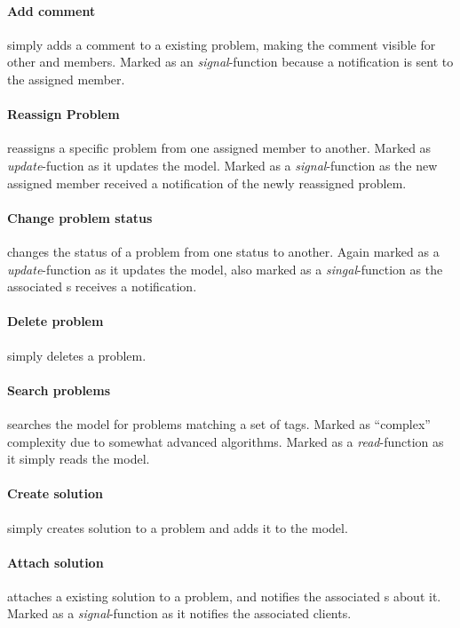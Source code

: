 \paragraph{Add comment} simply adds a comment to a existing problem, making the comment visible for other \client{} and \astaff[] members. Marked as an \textit{signal}-function because a notification is sent to the assigned \astaff[] member.  

\paragraph{Reassign Problem} reassigns a specific problem from one assigned \astaff[] member to another. Marked as \textit{update}-fuction as it updates the model. Marked as a \textit{signal}-function as the new assigned \astaff[] member received a notification of the newly reassigned problem. 

\paragraph{Change problem status} changes the status of a problem from one status to another. Again marked as a \textit{update}-function as it updates the model, also marked as a \textit{singal}-function as the associated \client s receives a notification. 

\paragraph{Delete problem} simply deletes a problem. 

\paragraph{Search problems} searches the model for problems matching a set of tags. Marked as ``complex'' complexity due to somewhat advanced algorithms. Marked as a \textit{read}-function as it simply reads the model.

\paragraph{Create solution} simply creates solution to a problem and adds it to the model. 

\paragraph{Attach solution} attaches a existing solution to a problem, and notifies the associated \client s about it. Marked as a \textit{signal}-function as it notifies the associated clients. 

